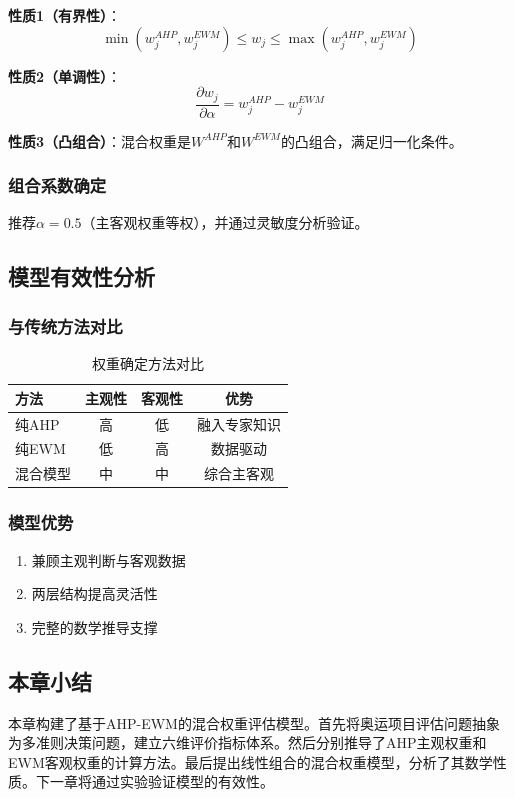\textbf{性质1（有界性）}：
\begin{equation}
\min(w_j^{AHP}, w_j^{EWM}) \leq w_j \leq \max(w_j^{AHP}, w_j^{EWM})
\end{equation}

\textbf{性质2（单调性）}：
\begin{equation}
\frac{\partial w_j}{\partial \alpha} = w_j^{AHP} - w_j^{EWM}
\end{equation}

\textbf{性质3（凸组合）}：混合权重是$W^{AHP}$和$W^{EWM}$的凸组合，满足归一化条件。

\subsubsection{组合系数确定}

推荐$\alpha = 0.5$（主客观权重等权），并通过灵敏度分析验证。

\subsection{模型有效性分析}

\subsubsection{与传统方法对比}

\begin{table}[htbp]
\centering
\caption{权重确定方法对比}
\label{tab:weight_comparison}
\begin{tabular}{lccc}
\toprule
方法 & 主观性 & 客观性 & 优势 \\
\midrule
纯AHP & 高 & 低 & 融入专家知识 \\
纯EWM & 低 & 高 & 数据驱动 \\
混合模型 & 中 & 中 & 综合主客观 \\
\bottomrule
\end{tabular}
\end{table}

\subsubsection{模型优势}

\begin{enumerate}
\item 兼顾主观判断与客观数据
\item 两层结构提高灵活性
\item 完整的数学推导支撑
\end{enumerate}

\subsection{本章小结}

本章构建了基于AHP-EWM的混合权重评估模型。首先将奥运项目评估问题抽象为多准则决策问题，建立六维评价指标体系。然后分别推导了AHP主观权重和EWM客观权重的计算方法。最后提出线性组合的混合权重模型，分析了其数学性质。下一章将通过实验验证模型的有效性。